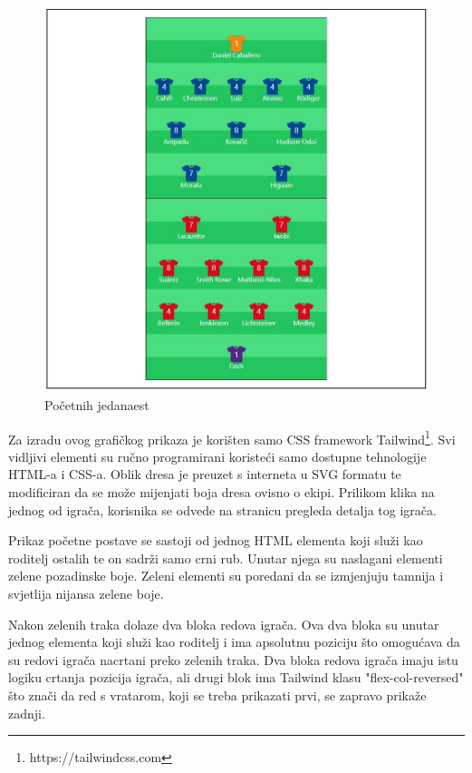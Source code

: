 \documentclass[times, utf8, zavrsni]{fer}
\begin{document}
\begin{figure}[htb]
\centering
\includegraphics[width=15cm]{images/formation.jpg}
\caption{Početnih jedanaest}
\label{fig:formation}
\end{figure}

Za izradu ovog grafičkog prikaza je korišten samo CSS framework Tailwind\footnote{https://tailwindcss.com}.
Svi vidljivi elementi su ručno programirani koristeći samo dostupne tehnologije HTML-a i CSS-a. Oblik dresa je preuzet s interneta u SVG formatu te modificiran da se može mijenjati boja dresa ovisno o ekipi.
Prilikom klika na jednog od igrača, korisnika se odvede na stranicu pregleda detalja tog igrača.

Prikaz početne postave se sastoji od jednog HTML elementa koji služi kao roditelj ostalih te on sadrži samo crni rub.
Unutar njega su naslagani elementi zelene pozadinske boje. Zeleni elementi su poredani da se izmjenjuju tamnija i svjetlija nijansa zelene boje.

Nakon zelenih traka dolaze dva bloka redova igrača. Ova dva bloka su unutar jednog elementa koji služi kao roditelj i ima apsolutnu poziciju što omogućava da su redovi igrača nacrtani preko zelenih traka.
Dva bloka redova igrača imaju istu logiku crtanja pozicija igrača, ali drugi blok ima Tailwind klasu "flex-col-reversed" što znači da red s vratarom, koji se treba prikazati prvi, se zapravo prikaže zadnji.
\end{document}

